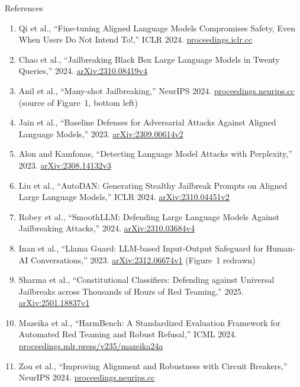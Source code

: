 \begin{frame}[allowframebreaks]{References}
\begin{enumerate}
    \item Qi et al., ``Fine-tuning Aligned Language Models Compromises Safety, Even When Users Do Not Intend To!,'' ICLR 2024. \href{https://proceedings.iclr.cc/paper_files/paper/2024/hash/83b7da3ed13f06c13ce82235c8eedf35-Abstract-Conference.html}{proceedings.iclr.cc}
    \item Chao et al., ``Jailbreaking Black Box Large Language Models in Twenty Queries,'' 2024. \href{https://arxiv.org/abs/2310.08419v4}{arXiv:2310.08419v4}
    \item Anil et al., ``Many-shot Jailbreaking,'' NeurIPS 2024. \href{https://proceedings.neurips.cc/paper_files/paper/2024/hash/ea456e232efb72d261715e33ce25f208-Abstract-Conference.html}{proceedings.neurips.cc} (source of Figure~1, bottom left)
    \item Jain et al., ``Baseline Defenses for Adversarial Attacks Against Aligned Language Models,'' 2023. \href{https://arxiv.org/abs/2309.00614v2}{arXiv:2309.00614v2}
    \item Alon and Kamfonas, ``Detecting Language Model Attacks with Perplexity,'' 2023. \href{https://arxiv.org/abs/2308.14132v3}{arXiv:2308.14132v3}
    \item Liu et al., ``AutoDAN: Generating Stealthy Jailbreak Prompts on Aligned Large Language Models,'' ICLR 2024. \href{https://arxiv.org/abs/2310.04451v2}{arXiv:2310.04451v2}
    \item Robey et al., ``SmoothLLM: Defending Large Language Models Against Jailbreaking Attacks,'' 2024. \href{https://arxiv.org/abs/2310.03684v4}{arXiv:2310.03684v4}
    \item Inan et al., ``Llama Guard: LLM-based Input-Output Safeguard for Human-AI Conversations,'' 2023. \href{https://arxiv.org/abs/2312.06674v1}{arXiv:2312.06674v1} (Figure~1 redrawn)
    \item Sharma et al., ``Constitutional Classifiers: Defending against Universal Jailbreaks across Thousands of Hours of Red Teaming,'' 2025. \href{https://arxiv.org/abs/2501.18837v1}{arXiv:2501.18837v1}
    \item Mazeika et al., ``HarmBench: A Standardized Evaluation Framework for Automated Red Teaming and Robust Refusal,'' ICML 2024. \href{https://proceedings.mlr.press/v235/mazeika24a.html}{proceedings.mlr.press/v235/mazeika24a}
    \item Zou et al., ``Improving Alignment and Robustness with Circuit Breakers,'' NeurIPS 2024. \href{https://proceedings.neurips.cc/paper_files/paper/2024/hash/97ca7168c2c333df5ea61ece3b3276e1-Abstract-Conference.html}{proceedings.neurips.cc}

\end{enumerate}
\end{frame}
